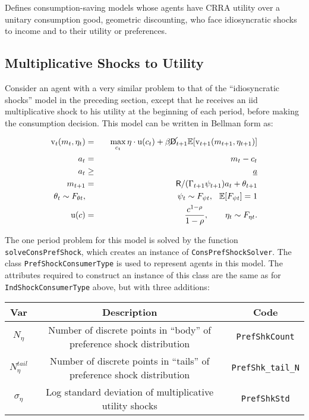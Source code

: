 \documentclass[12pt,titlepage,letterpaper]{econtex}
\newcommand{\E}{\mathbb{E}}
\begin{document}
Defines consumption-saving models whose agents have CRRA utility over a unitary consumption good, geometric discounting, who face idiosyncratic shocks to income and to their utility or preferences.

\subsection{Multiplicative Shocks to Utility}

Consider an agent with a very similar problem to that of the ``idiosyncratic shocks'' model in the preceding section, except that he receives an iid multiplicative shock to his utility at the beginning of each period, before making the consumption decision.  This model can be written in Bellman form as:

\begin{eqnarray*}
\vFunc_t(m_t,\eta_t) &=& \max_{c_t} \eta \cdot \utilFunc(c_t) + \beta \PLives_{t+1} \E [\vFunc_{t+1}(m_{t+1},\eta_{t+1}) ] \\
a_t &=& m_t - c_t \\
a_t &\geq& \underline{a} \\
m_{t+1} &=& \Rfree/(\Gamma_{t+1} \psi_{t+1}) a_t + \theta_{t+1} \\
\theta_t \sim F_{\theta t}, &\qquad& \psi_t \sim F_{\psi t}, \hspace{0.25cm} \E[F_{\psi t}] = 1\\
\utilFunc(c) &=& \frac{c^{1-\CRRA}}{1-\CRRA}, \qquad \eta_t \sim F_{\eta t}.
\end{eqnarray*}

The one period problem for this model is solved by the function \texttt{solveConsPrefShock}, which creates an instance of \texttt{ConsPrefShockSolver}.  The class \texttt{PrefShockConsumerType} is used to represent agents in this model.  The attributes required to construct an instance of this class are the same as for \texttt{IndShockConsumerType} above, but with three additions:
\begin{table}[h!]
\centering
\begin{tabular}{c c c}
Var & Description & Code \\
\hline
$N_\eta$ & Number of discrete points in ``body'' of preference shock distribution & \texttt{PrefShkCount} \\
$N_\eta^{tail}$ & Number of discrete points in ``tails'' of preference shock distribution & \texttt{PrefShk\_tail\_N} \\
$\sigma_\eta$ & Log standard deviation of multiplicative utility shocks & \texttt{PrefShkStd}
\end{tabular}
\end{table}
\end{document}
